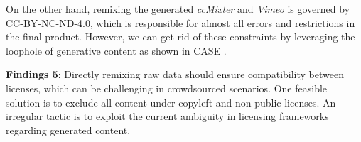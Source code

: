 On the other hand, remixing the generated \textit{ccMixter} and \textit{Vimeo} is governed by CC-BY-NC-ND-4.0, which is responsible for almost all errors and restrictions in the final product.
However, we can get rid of these constraints by leveraging the loophole of generative content as shown in CASE .


\begin{tcolorbox}
\textbf{Findings 5}: Directly remixing raw data should ensure compatibility between licenses, which can be challenging in crowdsourced scenarios.
One feasible solution is to exclude all content under copyleft and non-public licenses. 
An irregular tactic is to exploit the current ambiguity in licensing frameworks regarding generated content.
\end{tcolorbox}
